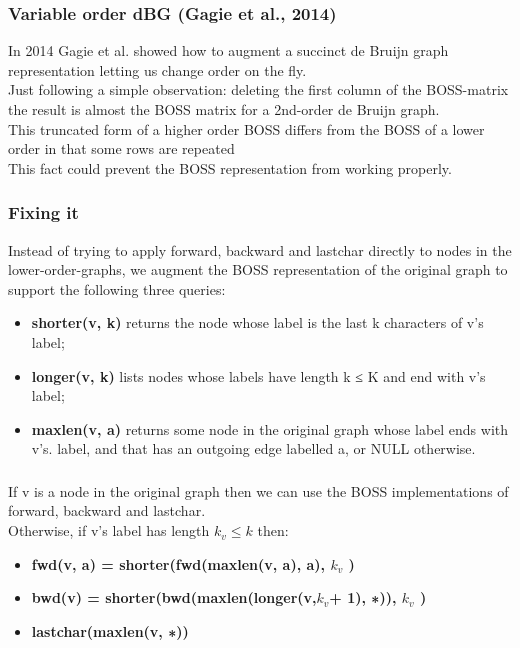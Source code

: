 \begin{frame}
\frametitle{Variable order dBG (Gagie et al., 2014)}
In 2014 Gagie et al. showed how to augment a succinct de Bruijn graph
representation letting us change order on the fly.
\\ \medskip
Just following a simple observation: deleting the first column of the BOSS-matrix the result is almost the BOSS matrix for a 2nd-order de Bruijn graph.
\\ \medskip
This truncated form of a higher order BOSS differs from the BOSS of a lower order in that some rows are repeated
\\ \medskip
This fact could prevent the BOSS representation from working properly. 
\end{frame}

\begin{frame}
\frametitle{Fixing it}
Instead of trying to apply forward, backward and
lastchar directly to nodes in the lower-order-graphs, we augment the BOSS representation of
the original graph to support the following three queries:
\begin{itemize}
	\item \textbf{shorter(v, k)} returns the node whose label is the last k characters of v’s label;
	\item \textbf{longer(v, k)} lists nodes whose labels have length k ≤ K and end with v’s label;
	\item \textbf{maxlen(v, a)} returns some node in the original graph whose label ends with v’s. label, and that has an outgoing edge labelled a, or NULL otherwise.
\end{itemize}
\end{frame}


\begin{frame}
\frametitle{}
If v is a node in the original graph then we
can use the BOSS implementations of forward, backward and lastchar.
\\ \medskip
Otherwise, if v’s label has length $k_v \leq k$ then:
\begin{itemize}
	\item \textbf{fwd(v, a) = shorter(fwd(maxlen(v, a), a), $k_v$ )}
	\item \textbf{bwd(v) = shorter(bwd(maxlen(longer(v,$k_v$+ 1), ∗)), $k_v$ )}
	\item \textbf{lastchar(maxlen(v, ∗))}
\end{itemize}
\end{frame}


